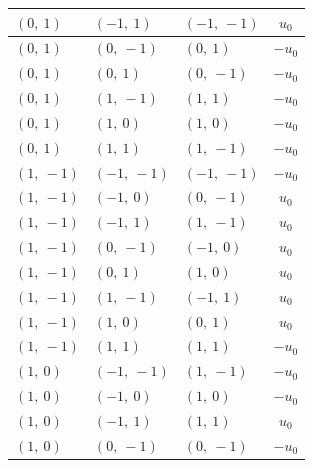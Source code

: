 \documentclass[11pt]{article}
\theoremstyle{definition}
\begin{document}
\begin{longtable}{|l|l|l|c|}
    \hline
    $\left( 0, \  1\right)$ & $\left( -1, \  1\right)$ & $\left( -1, \  -1\right)$ & $u_{0}$ \\
    \hline
    $\left( 0, \  1\right)$ & $\left( 0, \  -1\right)$ & $\left( 0, \  1\right)$ & $- u_{0}$ \\
    \hline
    $\left( 0, \  1\right)$ & $\left( 0, \  1\right)$ & $\left( 0, \  -1\right)$ & $- u_{0}$ \\
    \hline
    $\left( 0, \  1\right)$ & $\left( 1, \  -1\right)$ & $\left( 1, \  1\right)$ & $- u_{0}$ \\
    \hline
    $\left( 0, \  1\right)$ & $\left( 1, \  0\right)$ & $\left( 1, \  0\right)$ & $- u_{0}$ \\
    \hline
    $\left( 0, \  1\right)$ & $\left( 1, \  1\right)$ & $\left( 1, \  -1\right)$ & $- u_{0}$ \\
    \hline
    $\left( 1, \  -1\right)$ & $\left( -1, \  -1\right)$ & $\left( -1, \  -1\right)$ & $- u_{0}$ \\
    \hline
    $\left( 1, \  -1\right)$ & $\left( -1, \  0\right)$ & $\left( 0, \  -1\right)$ & $u_{0}$ \\
    \hline
    $\left( 1, \  -1\right)$ & $\left( -1, \  1\right)$ & $\left( 1, \  -1\right)$ & $u_{0}$ \\
    \hline
    $\left( 1, \  -1\right)$ & $\left( 0, \  -1\right)$ & $\left( -1, \  0\right)$ & $u_{0}$ \\
    \hline
    $\left( 1, \  -1\right)$ & $\left( 0, \  1\right)$ & $\left( 1, \  0\right)$ & $u_{0}$ \\
    \hline
    $\left( 1, \  -1\right)$ & $\left( 1, \  -1\right)$ & $\left( -1, \  1\right)$ & $u_{0}$ \\
    \hline
    $\left( 1, \  -1\right)$ & $\left( 1, \  0\right)$ & $\left( 0, \  1\right)$ & $u_{0}$ \\
    \hline
    $\left( 1, \  -1\right)$ & $\left( 1, \  1\right)$ & $\left( 1, \  1\right)$ & $- u_{0}$ \\
    \hline
    $\left( 1, \  0\right)$ & $\left( -1, \  -1\right)$ & $\left( 1, \  -1\right)$ & $- u_{0}$ \\
    \hline
    $\left( 1, \  0\right)$ & $\left( -1, \  0\right)$ & $\left( 1, \  0\right)$ & $- u_{0}$ \\
    \hline
    $\left( 1, \  0\right)$ & $\left( -1, \  1\right)$ & $\left( 1, \  1\right)$ & $u_{0}$ \\
    \hline
    $\left( 1, \  0\right)$ & $\left( 0, \  -1\right)$ & $\left( 0, \  -1\right)$ & $- u_{0}$ \\

\end{longtable}
\end{document}

